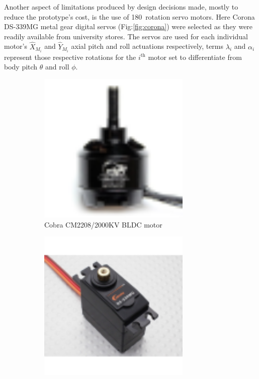 \par
Another aspect of limitations produced by design decisions made, mostly to reduce the prototype's cost, is the use of 180\textdegree ~rotation servo motors. Here Corona DS-339MG metal gear digital servos (Fig:\ref{fig:corona}) were selected as they were readily available from university stores. The servos are used for each individual motor's $\hat{X}_{M_i}$ and $\hat{Y}_{M_i}$ axial pitch and roll actuations respectively, terms $\lambda_i$ and $\alpha_i$ represent those respective rotations for the $i^{\text{th}}$ motor set to differentiate from body pitch $\theta$ and roll $\phi$.
\par
\begin{figure}[hbtp]
\vspace{-4pt}
\begin{subfigure}{0.5\textwidth}
\centering
\includegraphics[width=0.8\textwidth]{figs/cobra-motor}
\vspace{-6pt}
\caption{Cobra CM2208/2000KV BLDC motor~\cite{cobraimage}}
\label{fig:cobra}
\end{subfigure}
\begin{subfigure}{0.5\textwidth}
\centering
\includegraphics[width=0.8\textwidth]{figs/corona-servo}

\end{subfigure}
\end{figure}

